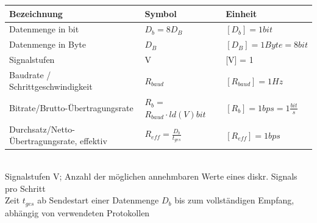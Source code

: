 \documentclass[fs, footer]{latex4ei}
\begin{document}
	
	\begin{tabular*}{\columnwidth}{p{1.8cm} | p{1.6cm} | p{2.5cm}}
		Bezeichnung & Symbol & Einheit \\ \hline
		Datenmenge in bit & $D_b = 8 D_B $ & $[D_b] = 1 bit$   \\ \hline
		Datenmenge in Byte & $D_B$ & $[D_B] = 1 Byte = 8 bit  $  \\ \hline
		Signalstufen & V & [V] = 1   \\ \hline
		Baudrate / Schrittgeschwindigkeit & $R_{baud}$ & $[R_{baud}] = 1 Hz $   \\ \hline
		Bitrate/Brutto-Übertragungsrate & $R_b = $$ R_{baud} \cdot ld(V) bit $ & $[R_b] = 1 bps = 1 \frac{bit}{s} $  \\ \hline
		Durchsatz/Netto-Übertragungsrate, effektiv & $R_{eff} = \frac{D_b}{t_{ges}}$ & $[R_{eff}] = 1 bps $ \\
		
		
	\end{tabular*}\\
	
	Signalstufen V; Anzahl der möglichen annehmbaren Werte eines diskr. Signals pro Schritt \\
	Zeit $t_{ges}$ ab Sendestart einer Datenmenge $D_b$ bis zum vollständigen Empfang, abhängig von verwendeten Protokollen \\
	
	


\end{document}
